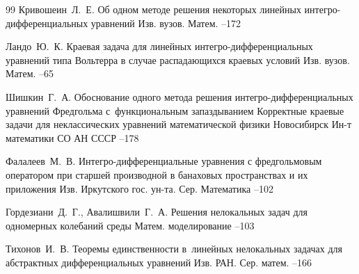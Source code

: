 \begin{thebibliography}{99}
\by Кривошеин~Л.~Е.
\paper Об одном методе решения некоторых линейных интегро-дифференциальных уравнений
\jour Изв. вузов. Матем.
--172

\by Ландо~Ю.~К.
\paper Краевая задача для линейных интегро-дифференциальных уравнений типа Вольтерра в случае распадающихся краевых условий
\jour Изв. вузов. Матем.
--65

\by Шишкин~Г.~А.
\paper Обоснование одного метода решения интегро-дифференциальных уравнений Фредгольма с~функциональным запаздыванием
\inbook Корректные краевые задачи для неклассических уравнений математической физики
\publaddr Новосибирск
\publ Ин-т математики СО АН СССР
--178

\by Фалалеев~М.~В.
\paper Интегро-дифференциальные уравнения с фредгольмовым оператором при старшей производной в банаховых пространствах и их приложения
\jour Изв. Иркутского гос. ун-та. Сер. Математика
--102

\by Гордезиани~Д.~Г., Авалишвили~Г.~А.
\paper Решения нелокальных задач для одномерных колебаний среды
\jour Матем. моделирование
--103

\by Тихонов~И.~В.
\paper Теоремы единственности в~линейных нелокальных задачах для абстрактных дифференциальных уравнений
\jour Изв. РАН. Сер. матем.
--166


\end{thebibliography}
